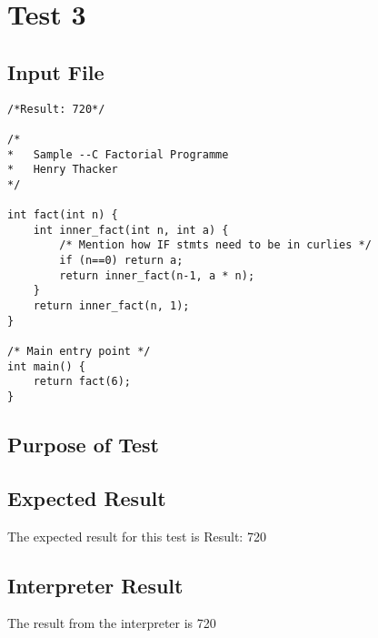 \section{Test 3}
\subsection{Input File}
\begin{verbatim}
/*Result: 720*/

/*
*	Sample --C Factorial Programme
*	Henry Thacker
*/

int fact(int n) {
	int inner_fact(int n, int a) {
		/* Mention how IF stmts need to be in curlies */
		if (n==0) return a;
		return inner_fact(n-1, a * n);
	}
	return inner_fact(n, 1);
}

/* Main entry point */
int main() {
	return fact(6);
}\end{verbatim}\subsection{Purpose of Test}

\subsection{Expected Result}
The expected result for this test is Result: 720
\subsection{Interpreter Result}
The result from the interpreter is 720
